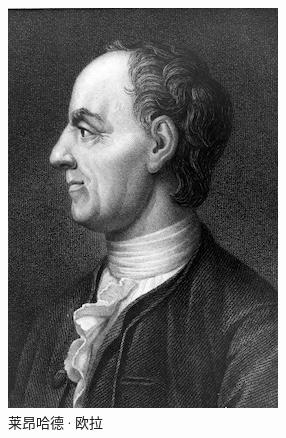 \documentclass[b5paper]{ctexart}
\begin{document}
\begin{figure}[htbp]
  \centering
  \includegraphics[scale=0.45]{img/Euler}
  \caption{莱昂哈德·欧拉}
 \label{fig:Euler}
\end{figure}
\end{document}

